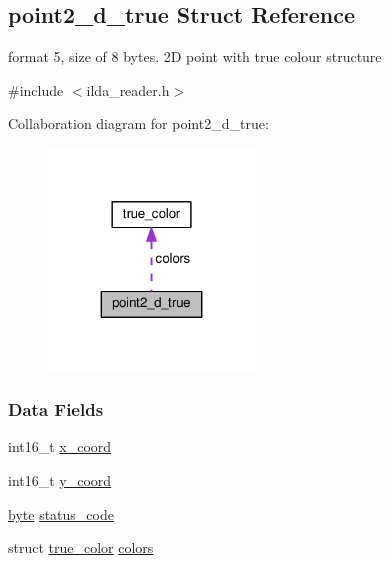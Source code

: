 \hypertarget{structpoint2__d__true}{}\subsection{point2\+\_\+d\+\_\+true Struct Reference}
\label{structpoint2__d__true}


format 5, size of 8 bytes. 2D point with true colour structure  




{\ttfamily \#include $<$ilda\+\_\+reader.\+h$>$}



Collaboration diagram for point2\+\_\+d\+\_\+true\+:\nopagebreak
\begin{figure}[H]
\begin{center}
\leavevmode
\includegraphics[width=155pt]{structpoint2__d__true__coll__graph}
\end{center}
\end{figure}
\subsubsection*{Data Fields}
\begin{DoxyCompactItemize}
\item 
int16\+\_\+t \hyperlink{structpoint2__d__true_a7625206de81434de8e73402879ef4097}{x\+\_\+coord}
\item 
int16\+\_\+t \hyperlink{structpoint2__d__true_a60cba7c6a2b3a2484708a1f4b89cae3b}{y\+\_\+coord}
\item 
\hyperlink{ilda__reader_8h_a0c8186d9b9b7880309c27230bbb5e69d}{byte} \hyperlink{structpoint2__d__true_adf21432adfbce8fbec69ae4032f0efdd}{status\+\_\+code}
\item 
struct \hyperlink{structtrue__color}{true\+\_\+color} \hyperlink{structpoint2__d__true_a9d3523137b35d48f7c1999de020bb3ed}{colors}
\end{DoxyCompactItemize}


